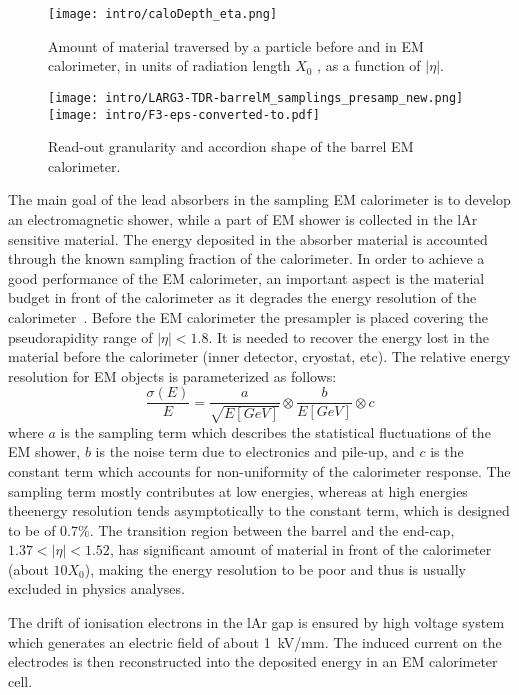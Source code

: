 \begin{figure}[h!]
\centering
 \texttt{[image: intro/caloDepth\_eta.png]}
 \caption{Amount of material traversed by a particle before and in EM calorimeter, in units of radiation length $X_0$ , as a function of $|\eta|$.}
\label{fig:Calo}
\end{figure}

\begin{figure}[h!]
\centering
 \texttt{[image: intro/LARG3-TDR-barrelM\_samplings\_presamp\_new.png]}
 \texttt{[image: intro/F3-eps-converted-to.pdf]}
 \caption{Read-out granularity and accordion shape of the barrel EM calorimeter.}
\label{fig:EMgran}
\end{figure}

The main goal of the lead absorbers in the sampling EM calorimeter is to develop an electromagnetic shower, while a part of EM shower is collected in the lAr sensitive material. The energy deposited in the absorber material is accounted through the known sampling fraction of the calorimeter. In order to achieve a good performance of the EM calorimeter, an important aspect is the material budget in front of the calorimeter as it degrades the energy resolution of the calorimeter~\cite{electron_tight}.
Before the EM calorimeter the presampler is placed covering the pseudorapidity range of $|\eta|<1.8$. It is needed to recover the energy lost in the material before the calorimeter (inner detector, cryostat, etc).
The relative energy resolution for EM objects is parameterized as follows:
\begin{equation}
\frac{\sigma(E)}{E}=\frac{a}{\sqrt{E[GeV]}}\otimes\frac{b}{E[GeV]}\otimes c
\end{equation}
where $a$ is the sampling term which describes the statistical fluctuations of the EM shower, $b$ is the noise term due to electronics and pile-up, and $c$ is the constant term which accounts for non-uniformity of the calorimeter response. The sampling term mostly contributes at low energies, whereas at high energies theenergy resolution tends asymptotically to the constant term, which is designed  to be of 0.7\%.
The transition region between the barrel and the end-cap, $1.37<|\eta|<1.52$, has significant amount of material in front of the calorimeter (about $ 10 X_0$), making the energy resolution to be poor and thus is usually excluded in physics analyses.

The drift of ionisation electrons in the lAr gap is ensured by high voltage system which generates an electric field of about 1~kV/mm. The induced current on the electrodes is then reconstructed into the deposited energy in an EM calorimeter cell.


